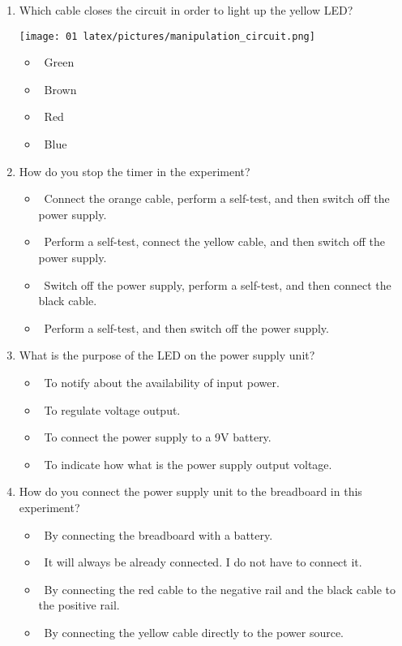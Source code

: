 \documentclass[msom,nonblindrev]{01 latex/class/informs3}
\begin{document}
\begin{APPENDICES}
\begin{enumerate}
  \item Which cable closes the circuit in order to light up the yellow LED? 
  \begin{center}
   \texttt{[image: 01 latex/pictures/manipulation\_circuit.png]}
  \end{center}
   \begin{itemize}
    \item \radiobutton\ Green
    \item \radiobutton\ Brown
    \item \radiobutton\ Red
    \item \radiobutton\ Blue
   \end{itemize}

  \item How do you stop the timer in the experiment? 
   \begin{itemize}
    \item \radiobutton\ Connect the orange cable, perform a self-test, and then switch off the power supply.
    \item \radiobutton\ Perform a self-test, connect the yellow cable, and then switch off the power supply.
    \item \radiobutton\ Switch off the power supply, perform a self-test, and then connect the black cable.
    \item \radiobutton\ Perform a self-test, and then switch off the power supply.
   \end{itemize}

  \item What is the purpose of the LED on the power supply unit? 
   \begin{itemize}
    \item \radiobutton\ To notify about the availability of input power.
    \item \radiobutton\ To regulate voltage output.
    \item \radiobutton\ To connect the power supply to a 9V battery.
    \item \radiobutton\ To indicate how what is the power supply output voltage.
   \end{itemize}

  \item How do you connect the power supply unit to the breadboard in this experiment?
   \begin{itemize}
    \item \radiobutton\ By connecting the breadboard with a battery.
    \item \radiobutton\ It will always be already connected. I do not have to connect it.
    \item \radiobutton\ By connecting the red cable to the negative rail and the black cable to the positive rail.
    \item \radiobutton\ By connecting the yellow cable directly to the power source.
   \end{itemize}


\end{enumerate}
\end{APPENDICES}
\end{document}
